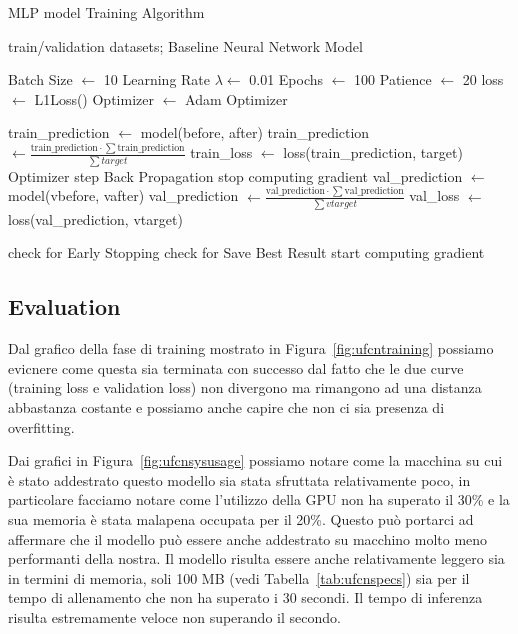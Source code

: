 \begin{algorithm}[H]
	\caption{MLP model Training Algorithm}\label{alg:ufcntraining}
	\begin{algorithmic}
		\Require train/validation datasets; Baseline Neural Network Model

		\State Batch Size $\gets$ 10
		\State Learning Rate $\lambda \gets$ 0.01
		\State Epochs $\gets$ 100
		\State Patience $\gets$ 20
		\State loss $\gets$ L1Loss()
		\State Optimizer $\gets$ Adam Optimizer
		\State

		\State train\_prediction $\gets$ model(before, after) 
		\State train\_prediction $\gets \frac{\text{train\_prediction} \cdot \sum\text{train\_prediction}}{\sum target}$ 
		\State train\_loss $\gets$ loss(train\_prediction, target)
		\State Optimizer step
		\State Back Propagation
		\EndFor
		\State stop computing gradient
		\State val\_prediction $\gets$ model(vbefore, vafter) 
		\State val\_prediction $\gets \frac{\text{val\_prediction} \cdot \sum\text{val\_prediction}}{\sum vtarget}$ 
		\State val\_loss $\gets$ loss(val\_prediction, vtarget)
		\EndFor

		\State check for Early Stopping
		\State check for Save Best Result
		\State start computing gradient
		\EndFor
	\end{algorithmic}
\end{algorithm}

\subsection{Evaluation}
Dal grafico della fase di training mostrato in Figura~\ref{fig:ufcntraining}
possiamo evicnere come questa sia terminata con successo dal
fatto che le due curve (training loss e validation loss) non divergono
ma rimangono ad una distanza abbastanza costante e possiamo
anche capire che non ci sia presenza di overfitting.

Dai grafici in Figura~\ref{fig:ufcnsysusage} possiamo notare come
la macchina su cui è stato addestrato questo modello sia stata
sfruttata relativamente poco, in particolare facciamo notare come
l'utilizzo della GPU non ha superato il 30\% e la sua memoria è stata
malapena occupata per il 20\%. Questo può portarci ad affermare che
il modello può essere anche addestrato su macchino molto meno performanti
della nostra. Il modello risulta essere anche relativamente leggero sia
in termini di memoria, soli 100 MB (vedi Tabella~\ref{tab:ufcnspecs}) sia
per il tempo di allenamento che non ha superato i 30 secondi. Il tempo di
inferenza risulta estremamente veloce non superando il secondo.

